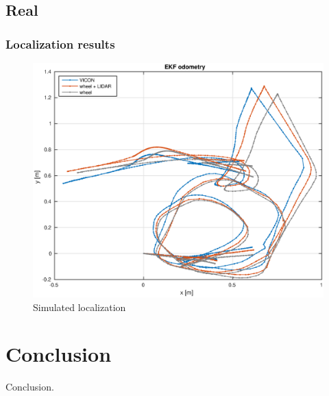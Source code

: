 \documentclass[times, utf8, diplomski, english]{fer}
\begin{document}
\section{Real}

\subsection{Localization results}

\begin{figure}[h]
\centering
\includegraphics[width=.75\textwidth]{thing_odometry_lidar}
\caption{Simulated localization}
\end{figure}






\chapter{Conclusion}
Conclusion.




\appendix
\end{document}
